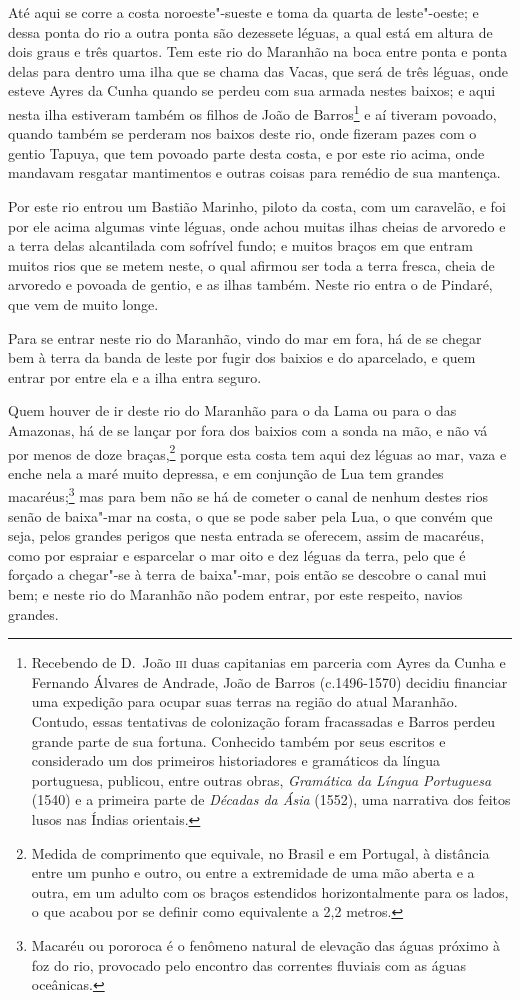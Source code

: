 Até aqui se corre a costa noroeste"-sueste e toma da quarta de leste"-oeste; e dessa ponta
do rio a outra ponta são dezessete léguas, a qual está em altura de dois graus e três
quartos. Tem este rio do Maranhão na boca entre ponta e ponta delas para dentro uma ilha
que se chama das Vacas, que será de três léguas, onde esteve Ayres da Cunha quando se
perdeu com sua armada nestes baixos; e aqui nesta ilha estiveram também os filhos de João
de Barros\footnote{ Recebendo de D.~João \textsc{iii} duas capitanias em parceria com
Ayres da Cunha e Fernando Álvares de Andrade, João de Barros (c.1496-1570) decidiu
financiar uma expedição para ocupar suas terras na região do atual Maranhão. Contudo,
essas tentativas de colonização foram fracassadas e Barros perdeu grande parte de sua
fortuna. Conhecido também por seus escritos e considerado um dos primeiros historiadores e
gramáticos da língua portuguesa, publicou, entre outras obras, \textit{Gramática da Língua
Portuguesa} (1540) e a primeira parte de \textit{Décadas da Ásia} (1552), uma narrativa
dos feitos lusos nas Índias orientais.} e aí tiveram povoado, quando também se perderam
nos baixos deste rio, onde fizeram pazes com o gentio Tapuya, que tem povoado parte desta
costa, e por este rio acima, onde mandavam resgatar mantimentos e outras coisas para
remédio de sua mantença.

Por este rio entrou um Bastião Marinho, piloto da costa, com um caravelão, e foi por ele
acima algumas vinte léguas, onde achou muitas ilhas cheias de arvoredo e a terra delas
alcantilada com sofrível fundo; e muitos braços em que entram muitos rios que se metem
neste, o qual afirmou ser toda a terra fresca, cheia de arvoredo e povoada de gentio, e as
ilhas também. Neste rio entra o de Pindaré, que vem de muito longe.

Para se entrar neste rio do Maranhão, vindo do mar em fora, há de se chegar bem à terra da
banda de leste por fugir dos baixios e do aparcelado, e quem entrar por entre ela e a ilha
entra seguro.

Quem houver de ir deste rio do Maranhão para o da Lama ou para o das Amazonas, há de se
lançar por fora dos baixios com a sonda na mão, e não vá por menos de doze
braças,\footnote{ Medida de comprimento que equivale, no Brasil e em Portugal, à distância
entre um punho e outro, ou entre a extremidade de uma mão aberta e a outra, em um adulto
com os braços estendidos horizontalmente para os lados, o que acabou por se definir como
equivalente a 2,2 metros.} porque esta costa tem aqui dez léguas ao mar, vaza e enche
nela a maré muito depressa, e em conjunção de Lua tem grandes macaréus;\footnote{ Macaréu
ou pororoca é o fenômeno natural de elevação das águas próximo à foz do rio, provocado
pelo encontro das correntes fluviais com as águas oceânicas.} mas para bem não se há de
cometer o canal de nenhum destes rios senão de baixa"-mar na costa, o que se pode saber
pela Lua, o que convém que seja, pelos grandes perigos que nesta entrada se oferecem,
assim de macaréus, como por espraiar e esparcelar o mar oito e dez léguas da terra, pelo
que é forçado a chegar"-se à terra de baixa"-mar, pois então se descobre o canal mui bem; e
neste rio do Maranhão não podem entrar, por este respeito, navios grandes.

